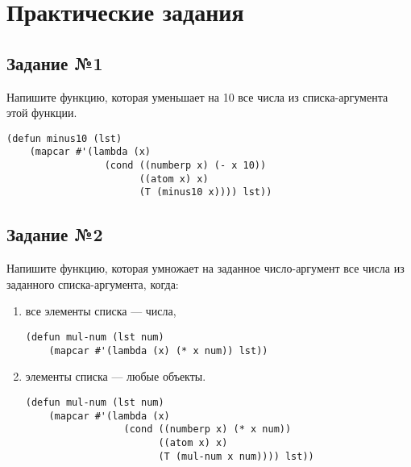 \chapter{Практические задания}

\section{Задание №1}

Напишите функцию, которая уменьшает на 10 все числа из списка-аргумента этой
функции.

\vspace{4mm}
\hfill
\begin{minipage}{0.92\linewidth}
\begin{lstlisting}
(defun minus10 (lst)
    (mapcar #'(lambda (x)
                 (cond ((numberp x) (- x 10))
                       ((atom x) x)
                       (T (minus10 x)))) lst))
\end{lstlisting}
\end{minipage}

\section{Задание №2}

Напишите функцию, которая умножает на заданное число-аргумент все числа
из заданного списка-аргумента, когда:

\begin{enumerate}
    \item все элементы списка --- числа,

\vspace{4mm}
\begin{minipage}{0.92\linewidth}
\begin{lstlisting}
(defun mul-num (lst num)
    (mapcar #'(lambda (x) (* x num)) lst))
\end{lstlisting}
\end{minipage}

    \item элементы списка --- любые объекты.

\vspace{4mm}
\begin{minipage}{0.92\linewidth}
\begin{lstlisting}
(defun mul-num (lst num)
    (mapcar #'(lambda (x)
                 (cond ((numberp x) (* x num))
                       ((atom x) x)
                       (T (mul-num x num)))) lst))
\end{lstlisting}
\end{minipage}
\end{enumerate}

